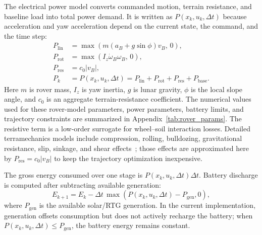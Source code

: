 \documentclass[conf]{new-aiaa}
\begin{document}
The electrical power model converts commanded motion, terrain resistance, and baseline load into total power demand. It is written as $P(x_k,u_k,\Delta t)$ because acceleration and yaw acceleration depend on the current state, the command, and the time step:
\begin{align}
    P_{\mathrm{lin}} &= \max\!\left(m\left(a_B + g\sin\phi\right)v_B,\,0\right), \\
    P_{\mathrm{rot}} &= \max\!\left(I_z \dot{\omega}_B \omega_B,\,0\right), \\
    P_{\mathrm{res}} &= c_0 |v_B|, \\
    P_k &= P(x_k,u_k,\Delta t)
        = P_{\mathrm{lin}} + P_{\mathrm{rot}} + P_{\mathrm{res}} + P_{\mathrm{base}}.
\end{align}
Here $m$ is rover mass, $I_z$ is yaw inertia, $g$ is lunar gravity, $\phi$ is the local slope angle, and $c_0$ is an aggregate terrain-resistance coefficient. The numerical values used for these rover-model parameters, power parameters, battery limits, and trajectory constraints are summarized in Appendix~\ref{tab:rover_params}. The resistive term is a low-order surrogate for wheel--soil interaction losses. Detailed terramechanics models include compression, rolling, bulldozing, gravitational resistance, slip, sinkage, and shear effects~\cite{li2022terramechanics}; those effects are approximated here by $P_{\mathrm{res}}=c_0|v_B|$ to keep the trajectory optimization inexpensive.

The gross energy consumed over one stage is $P(x_k,u_k,\Delta t)\Delta t$. Battery discharge is computed after subtracting available generation:
\begin{equation}
    E_{k+1} = E_k - \Delta t\,\max\!\left(P(x_k,u_k,\Delta t)-P_{\mathrm{gen}},0\right),
\end{equation}
where $P_{\mathrm{gen}}$ is the available solar/RTG generation. In the current implementation, generation offsets consumption but does not actively recharge the battery; when $P(x_k,u_k,\Delta t)\leq P_{\mathrm{gen}}$, the battery energy remains constant.
\end{document}
